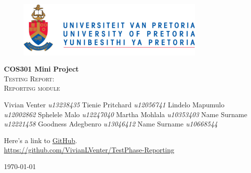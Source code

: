\begin{titlepage}
	\begin{center}
		
		\begin{figure}[t]
			\centering
			\includegraphics[width=350px]{images/UP_Logo.png}
		\end{figure}
		
		\textbf{\Large COS301 Mini Project } \\
		\textsc{\Large Testing Report:  } \\
		\textsc{\Large Reporting module } \\
		
		\begin{flushright} \large
			Vivian Venter 		\emph{u13238435} \newline
			Tienie Pritchard 	\emph{u12056741} \newline
			Lindelo Mapumulo	\emph{u12002862} \newline
			Sphelele Malo 		\emph{u12247040} \newline
			Martha Mohlala 		\emph{u10353403} \newline
			Name Surname 		\emph{u12221458} \newline
			Goodness Adegbenro	\emph{u13046412} \newline
			Name Surname 		\emph{u10668544} \newline
		\end{flushright}
		
		\vfill
		
	Here's a link to \href{https://github.com/VivianLVenter/TestPhase-Reporting}{GitHub}.\\
	\url{https://github.com/VivianLVenter/TestPhase-Reporting}

	\vfill

	{\large \today}		
		
		
	\end{center}
\end{titlepage}
